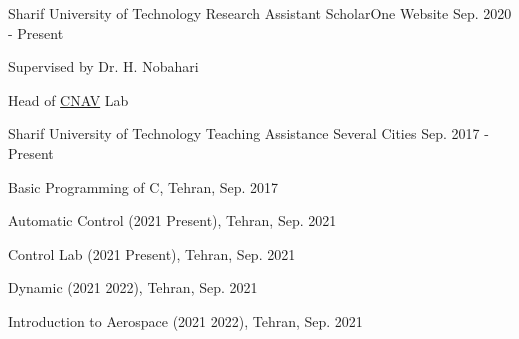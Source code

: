 \vspace{-3mm} 

\begin{cventries}
	
\vspace{1mm} 	
	\cventry
	{Sharif University of Technology} %
	{Research Assistant} %
	{ScholarOne Website}%
	{Sep. 2020 - Present} %
	{
		\begin{cvitems}
			\item{Supervised by Dr. H. Nobahari}
			\vspace{0.5mm}
			\item{Head of \href{https://www.linkedin.com/company/cnav-lab}{CNAV} Lab}
		\end{cvitems}
	}


	\cventry
{Sharif University of Technology} %
{Teaching Assistance} %
{Several Cities}%
{Sep. 2017 - Present} %
{
	\begin{cvitems} %
		\item {Basic Programming of C, Tehran, Sep. 2017}
		\item{Automatic Control (2021 Present), Tehran, Sep. 2021}
		\item{Control Lab (2021 Present), Tehran, Sep. 2021}
		\item{Dynamic (2021 2022), Tehran, Sep. 2021}
		\item{Introduction to Aerospace (2021 2022), Tehran, Sep. 2021}
	\end{cvitems}
}

\vspace{-4.0mm}  

 
\end{cventries}
